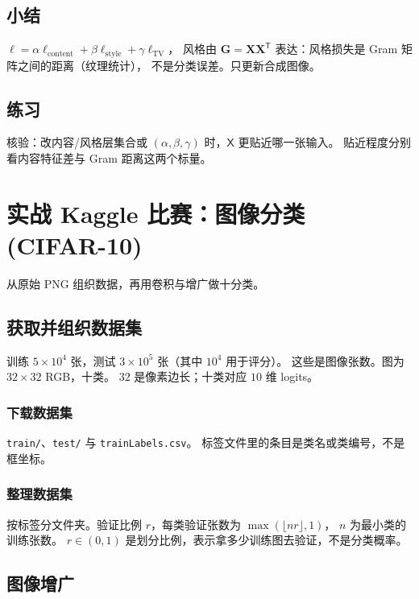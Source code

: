 \subsection{小结}

$\ell=\alpha\ell_{\mathrm{content}}+\beta\ell_{\mathrm{style}}+\gamma\ell_{\mathrm{TV}}$，
风格由 $\bm{G}=\bm{X}\bm{X}^{\mathsf T}$ 表达：风格损失是 Gram 矩阵之间的距离（纹理统计），
不是分类误差。只更新合成图像。

\subsection{练习}

核验：改内容/风格层集合或 $(\alpha,\beta,\gamma)$ 时，$\mathsf{X}$ 更贴近哪一张输入。
贴近程度分别看内容特征差与 Gram 距离这两个标量。

\section{实战 Kaggle 比赛：图像分类 (CIFAR-10)}

从原始 PNG 组织数据，再用卷积与增广做十分类。

\subsection{获取并组织数据集}

训练 $5\times 10^4$ 张，测试 $3\times 10^5$ 张（其中 $10^4$ 用于评分）。
这些是图像张数。图为 $32\times 32$ RGB，十类。
$32$ 是像素边长；十类对应 $10$ 维 logits。

\subsubsection{下载数据集}

\texttt{train/}、\texttt{test/} 与 \texttt{trainLabels.csv}。
标签文件里的条目是类名或类编号，不是框坐标。

\subsubsection{整理数据集}

按标签分文件夹。验证比例 $r$，每类验证张数为 $\max(\lfloor nr\rfloor,1)$，
$n$ 为最小类的训练张数。
$r\in(0,1)$ 是划分比例，表示拿多少训练图去验证，不是分类概率。

\subsection{图像增广}

